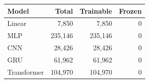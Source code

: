 \begin{tabular}{lrrr}
\toprule
Model & Total & Trainable & Frozen \\
\midrule
Linear & 7,850 & 7,850 & 0 \\
MLP & 235,146 & 235,146 & 0 \\
CNN & 28,426 & 28,426 & 0 \\
GRU & 61,962 & 61,962 & 0 \\
Transformer & 104,970 & 104,970 & 0 \\
\bottomrule
\end{tabular}
